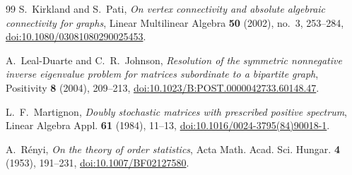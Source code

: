 \documentclass[11pt,reqno]{amsart}
\theoremstyle{definition}
\theoremstyle{remark}
\begin{document}
\begin{thebibliography}{99}
S.~Kirkland and S.~Pati,
\emph{On vertex connectivity and absolute algebraic connectivity for graphs},
Linear Multilinear Algebra \textbf{50} (2002), no.~3, 253--284,
\href{https://doi.org/10.1080/03081080290025453}{doi:10.1080/03081080290025453}.

A.~Leal-Duarte and C.~R.~Johnson,
\emph{Resolution of the symmetric nonnegative inverse eigenvalue problem for
matrices subordinate to a bipartite graph},
Positivity \textbf{8} (2004), 209--213,
\href{https://doi.org/10.1023/B:POST.0000042733.60148.47}
{doi:10.1023/B:POST.0000042733.60148.47}.

L.~F.~Martignon,
\emph{Doubly stochastic matrices with prescribed positive spectrum},
Linear Algebra Appl. \textbf{61} (1984), 11--13,
\href{https://doi.org/10.1016/0024-3795(84)90018-1}
{doi:10.1016/0024-3795(84)90018-1}.

A.~R\'enyi,
\emph{On the theory of order statistics},
Acta Math. Acad. Sci. Hungar. \textbf{4} (1953), 191--231,
\href{https://doi.org/10.1007/BF02127580}{doi:10.1007/BF02127580}.

\end{thebibliography}
\end{document}
